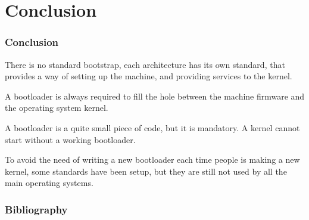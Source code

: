 \section{Conclusion}
\begin{frame}
  \frametitle{Conclusion}

  There is no standard bootstrap, each architecture has its own standard, that provides a way of setting up the machine, and providing services to the kernel.

  \-

  A bootloader is always required to fill the hole between the machine firmware and the operating system kernel.

  \-

  A bootloader is a quite small piece of code, but it is mandatory. A kernel cannot start without a working bootloader.

  \-

  To avoid the need of writing a new bootloader each time people is making a new kernel, some standards have been setup, but they are still not used by all the main operating systems.

\end{frame}

%
%

\begin{frame}[allowframebreaks]
  \frametitle{Bibliography}

  
  
\end{frame}


